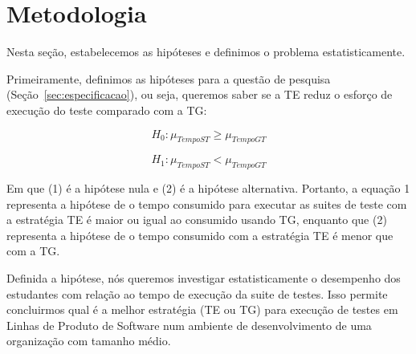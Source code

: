 \section{Metodologia}
\label{sec:metodologia}


Nesta seção, estabelecemos as hipóteses e definimos o problema estatisticamente.

Primeiramente, definimos as hipóteses para a questão de pesquisa (Seção~\ref{sec:especificacao}), ou seja, queremos saber se a TE reduz o esforço de execução do teste comparado com a TG:

\begin{equation}
	H_{0} : \mu_{TempoST} \geq \mu_{TempoGT}
\end{equation}

\begin{equation}
	H_{1} : \mu_{TempoST} < \mu_{TempoGT}
\end{equation}

Em que (1) é a hipótese nula e (2) é a hipótese alternativa. Portanto, a equação 1 representa a hipótese de o tempo consumido para executar as suites de teste com a estratégia TE é maior ou igual ao consumido usando TG, enquanto que (2) representa a hipótese de o tempo consumido com a estratégia TE é menor que com a TG.





Definida a hipótese, nós queremos investigar estatisticamente o desempenho dos estudantes com relação ao tempo de execução da suite de testes. Isso permite concluirmos qual é a melhor estratégia (TE ou TG) para execução de testes em Linhas de Produto de Software num ambiente de desenvolvimento de uma organização com tamanho médio.

